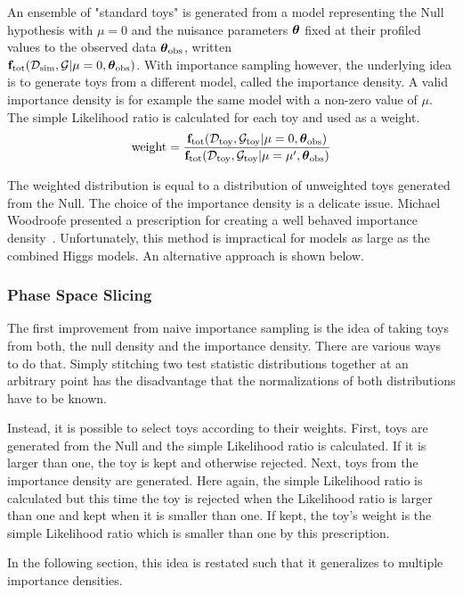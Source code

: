 \documentclass{cernrep}
\def\vec#1{\ifmmode
\mathchoice{\mbox{\boldmath$\displaystyle\bf#1$}}
{\mbox{\boldmath$\textstyle\bf#1$}}
{\mbox{\boldmath$\scriptstyle\bf#1$}}
{\mbox{\boldmath$\scriptscriptstyle\bf#1$}}\else
{\mbox{\boldmath$\bf#1$}}\fi}
\newcommand{\data}{{\ensuremath{\mathcal{D}}}}
\newcommand{\datasim}{{\ensuremath{\mathcal{D}_{\textrm{sim}}}}}
\newcommand{\F}{{\ensuremath{\mathbf{f}}}}
\newcommand{\globs}{{\ensuremath{\mathcal{G}}}}
\newcommand{\nuisObs}{\ensuremath{\vec\theta_{\rm obs}}}
\begin{document}
An ensemble of "standard toys" is generated from a model representing the Null hypothesis with $\mu=0$ and the nuisance parameters $\vec\theta$ fixed at their profiled values to the observed data $\nuisObs$, written\\ \mbox{$\F_{\rm tot}(\datasim,\globs|\mu=0,\nuisObs)$}. With importance sampling however, the underlying idea is to generate toys from a different model, called the importance density. A valid importance density is for example the same model with a non-zero value of $\mu$. The simple Likelihood ratio is calculated for each toy and used as a weight.
\[
{\rm weight} = \frac{\F_{\rm tot}( \data_{\rm toy}, \globs_{\rm toy} | \mu=0,\nuisObs)} {\F_{\rm tot}( \data_{\rm toy}, \globs_{\rm toy} | \mu=\mu',\nuisObs)}
\]

The weighted distribution is equal to a distribution of unweighted toys generated from the Null. The choice of the importance density is a delicate issue. Michael Woodroofe presented a prescription for creating a well behaved importance density~\cite{Woodroofe}. Unfortunately, this method is impractical for models as large as the combined Higgs models. An alternative approach is shown below.




\subsubsection{Phase Space Slicing}
The first improvement from naive importance sampling is the idea of taking toys from both, the null density and the importance density. There are various ways to do that. Simply stitching two test statistic distributions together at an arbitrary point has the disadvantage that the normalizations of both distributions have to be known.

Instead, it is possible to select toys according to their weights. First, toys are generated from the Null and the simple Likelihood ratio is calculated. If it is larger than one, the toy is kept and otherwise rejected. Next, toys from the importance density are generated. Here again, the simple Likelihood ratio is calculated but this time the toy is rejected when the Likelihood ratio is larger than one and kept when it is smaller than one. If kept, the toy's weight is the simple Likelihood ratio which is smaller than one by this prescription.

In the following section, this idea is restated such that it generalizes to multiple importance densities.
\end{document}
